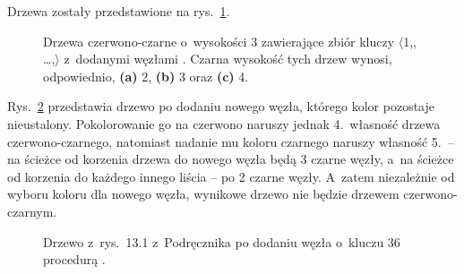 
\exercise %
Drzewa zostały przedstawione na rys.\ \ref{fig:13.1-1}.
\begin{figure}[ht]
	\centering 
	\caption{Drzewa czerwono-czarne o~wysokości 3 zawierające zbiór kluczy $\langle$1,,\! \dots,$\rangle$ z~dodanymi węzłami .
	Czarna wysokość tych drzew wynosi, odpowiednio, {\sffamily\bfseries(a)} 2, {\sffamily\bfseries(b)} 3 oraz {\sffamily\bfseries(c)} 4.} \label{fig:13.1-1}
\end{figure}

\exercise %
Rys.\ \ref{fig:13.1-2} przedstawia drzewo po dodaniu nowego węzła, którego kolor pozostaje nieustalony.
Pokolorowanie go na czerwono naruszy jednak 4.\ własność drzewa czerwono-czarnego, natomiast nadanie mu koloru czarnego naruszy własność 5.\ -- na ścieżce od korzenia drzewa do nowego węzła będą 3 czarne węzły, a~na ścieżce od korzenia do każdego innego liścia -- po 2 czarne węzły.
A~zatem niezależnie od wyboru koloru dla nowego węzła, wynikowe drzewo nie będzie drzewem czerwono-czarnym.
\begin{figure}[ht]
	\centering 
	\caption{Drzewo z~rys.\ 13.1 z~Podręcznika po dodaniu węzła o~kluczu 36 procedurą .} \label{fig:13.1-2}
\end{figure}

\exercise %
\exercise %
\exercise %
\exercise %
\exercise %

